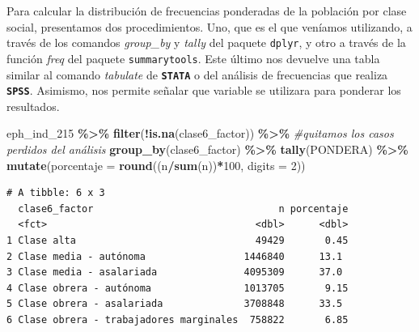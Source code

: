 \documentclass[
]{article}
\newenvironment{Shaded}{\begin{snugshade}}{\end{snugshade}}
\newcommand{\AttributeTok}[1]{\textcolor[rgb]{0.13,0.29,0.53}{#1}}
\newcommand{\CommentTok}[1]{\textcolor[rgb]{0.56,0.35,0.01}{\textit{#1}}}
\newcommand{\ConstantTok}[1]{\textcolor[rgb]{0.56,0.35,0.01}{#1}}
\newcommand{\DecValTok}[1]{\textcolor[rgb]{0.00,0.00,0.81}{#1}}
\newcommand{\FunctionTok}[1]{\textcolor[rgb]{0.13,0.29,0.53}{\textbf{#1}}}
\newcommand{\NormalTok}[1]{#1}
\newcommand{\SpecialCharTok}[1]{\textcolor[rgb]{0.81,0.36,0.00}{\textbf{#1}}}
\begin{document}
Para calcular la distribución de frecuencias ponderadas de la población por clase social, presentamos dos procedimientos. Uno, que es el que veníamos utilizando, a través de los comandos \emph{group\_by} y \emph{tally} del paquete \texttt{dplyr}, y otro a través de la función \emph{freq} del paquete \texttt{summarytools}. Este último nos devuelve una tabla similar al comando \emph{tabulate} de \textbf{\texttt{STATA}} o del análisis de frecuencias que realiza \textbf{\texttt{SPSS}}. Asimismo, nos permite señalar que variable se utilizara para ponderar los resultados.

\begin{Shaded}
\begin{Highlighting}[]
\NormalTok{eph\_ind\_215 }\SpecialCharTok{\%\textgreater{}\%}
    \FunctionTok{filter}\NormalTok{(}\SpecialCharTok{!}\FunctionTok{is.na}\NormalTok{(clase6\_factor)) }\SpecialCharTok{\%\textgreater{}\%} \CommentTok{\#quitamos los casos perdidos del análisis }
    \FunctionTok{group\_by}\NormalTok{(clase6\_factor) }\SpecialCharTok{\%\textgreater{}\%} 
    \FunctionTok{tally}\NormalTok{(PONDERA) }\SpecialCharTok{\%\textgreater{}\%} 
    \FunctionTok{mutate}\NormalTok{(}\AttributeTok{porcentaje =} \FunctionTok{round}\NormalTok{((n}\SpecialCharTok{/}\FunctionTok{sum}\NormalTok{(n))}\SpecialCharTok{*}\DecValTok{100}\NormalTok{, }\AttributeTok{digits =} \DecValTok{2}\NormalTok{))}
\end{Highlighting}
\end{Shaded}

\begin{verbatim}
# A tibble: 6 x 3
  clase6_factor                                n porcentaje
  <fct>                                    <dbl>      <dbl>
1 Clase alta                               49429       0.45
2 Clase media - autónoma                 1446840      13.1 
3 Clase media - asalariada               4095309      37.0 
4 Clase obrera - autónoma                1013705       9.15
5 Clase obrera - asalariada              3708848      33.5 
6 Clase obrera - trabajadores marginales  758822       6.85
\end{verbatim}

\begin{Shaded}
\end{Shaded}
\end{document}
